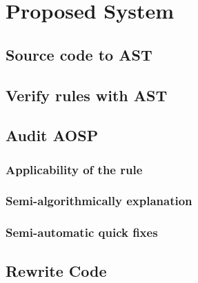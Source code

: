 \chapter{Proposed System}
 

   \section{Source code to AST}
   \section{Verify rules with AST}
	\section{Audit AOSP}
	\subsection{Applicability of the rule}
	\subsection{Semi-algorithmically explanation}
	\subsection{Semi-automatic quick fixes}
 
	 
	\section{Rewrite Code}
 
	 